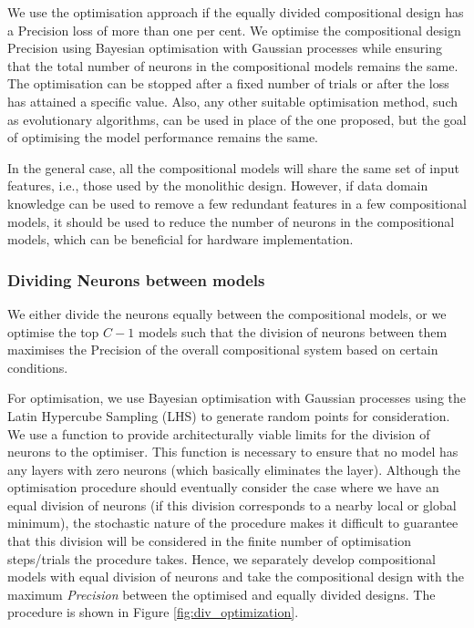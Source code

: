 We use the optimisation approach if the equally divided compositional design has a Precision loss of more than one per cent. We optimise the compositional design Precision using Bayesian optimisation with Gaussian processes \cite{mockus_bayesian_1975} while ensuring that the total number of neurons in the compositional models remains the same. 
The optimisation can be stopped after a fixed number of trials or after the loss has attained a specific value. Also, any other suitable optimisation method, such as evolutionary algorithms, can be used in place of the one proposed, but the goal of optimising the model performance remains the same. 

In the general case, all the compositional models will share the same set of input features, i.e., those used by the monolithic design. However, if data domain knowledge can be used to remove a few redundant features in a few compositional models, it should be used to reduce the number of neurons in the compositional models, which can be beneficial for hardware implementation. 



\subsubsection{Dividing Neurons between models}

We either divide the neurons equally between the compositional models, or we optimise the top $C-1$ models such that the division of neurons between them maximises the Precision \cite{kelleher_fundamentals_2020} of the overall compositional system based on certain conditions.

For optimisation, we use Bayesian optimisation with Gaussian processes \cite{mockus_bayesian_1975} using the Latin Hypercube Sampling (LHS) \cite{mckay_comparison_1979} to generate random points for consideration. We use a function to provide architecturally viable limits for the division of neurons to the optimiser. This function is necessary to ensure that no model has any layers with zero neurons (which basically eliminates the layer). Although the optimisation procedure should eventually consider the case where we have an equal division of neurons (if this division corresponds to a nearby local or global minimum), the stochastic nature of the procedure makes it difficult to guarantee that this division will be considered in the finite number of optimisation steps/trials the procedure takes. Hence, we separately develop compositional models with equal division of neurons and take the compositional design with the maximum \textit{Precision} between the optimised and equally divided designs. The procedure is shown in Figure \ref{fig:div_optimization}. 

